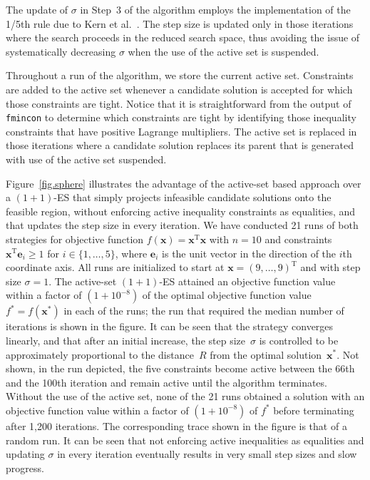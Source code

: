 \documentclass[oribibl]{llncs}
\newcommand{\x}{\ensuremath{\mathbf{x}}}
\begin{document}
The update of $\sigma$ in Step~3 of the algorithm employs the implementation of the 1/5th rule due to Kern et al.~\cite{kern04}. The step size is updated only in those iterations where the search proceeds in the reduced search space, thus avoiding the issue of systematically decreasing $\sigma$ when the use of the active set is suspended.

Throughout a run of the algorithm, we store the current active set. Constraints are added to the active set whenever a candidate solution is accepted for which those constraints are tight. Notice that it is straightforward from the output of \texttt{fmincon} to determine which constraints are tight by identifying those inequality constraints that have positive Lagrange multipliers. The active set is replaced in those iterations where a candidate solution replaces its parent that is generated with use of the active set suspended.
 
Figure~\ref{fig.sphere} illustrates the advantage of the active-set based approach over a $(1+1)$-ES that simply projects infeasible candidate solutions onto the feasible region, without enforcing active inequality constraints as equalities, and that updates the step size in every iteration. We have conducted 21 runs of both strategies for objective function $f(\x)=\x^\mathrm{T}\x$ with $n=10$ and constraints $\x^\mathrm{T}\mathbf{e}_i\geq1$ for $i\in\{1,\dots,5\}$, where $\mathbf{e}_i$ is the unit vector in the direction of the $i$th coordinate axis. All runs are initialized to start at $\x=(9,\dots,9)^\mathrm{T}$ and with step size $\sigma=1$. The active-set $(1+1)$-ES attained an objective function value within a factor of $(1+10^{-8})$ of the optimal objective function value $f^*=f(\x^*)$ in each of the runs; the run that required the median number of iterations is shown in the figure. It can be seen that the strategy converges linearly, and that after an initial increase, the step size~$\sigma$ is controlled to be approximately proportional to the distance~$R$ from the optimal solution~$\x^*$. Not shown, in the run depicted, the five constraints become active between the 66th and the 100th iteration and remain active until the algorithm terminates. Without the use of the active set, none of the 21 runs obtained a solution with an objective function value within a factor of $(1+10^{-8})$ of $f^*$ before terminating after 1,{}200 iterations. The corresponding trace shown in the figure is that of a random run. It can be seen that not enforcing active inequalities as equalities and updating $\sigma$ in every iteration eventually results in very small step sizes and slow progress.
\end{document}
